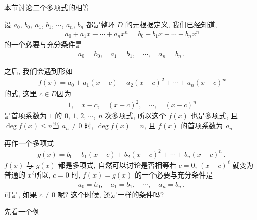 \subsection*{\PolynomialEquality}
\markright{\PolynomialEquality}

本节讨论二个多项式的相等\period

设 $a_0$, $b_0$, $a_1$, $b_1$, $\cdots$, $a_n$, $b_n$ 都是整环 $D$ 的元\period 根据定义, 我们已经知道,
\begin{align*}
    a_0 + a_1 x + \cdots + a_n x^n = b_0 + b_1 x + \cdots + b_n x^n
\end{align*}
的一个必要与充分条件是
\begin{align*}
    a_0 = b_0, \quad a_1 = b_1, \quad \cdots, \quad a_n = b_n \period
\end{align*}

之后, 我们会遇到形如
\begin{align*}
    f(x) = a_0 + a_1 (x - c) + a_2 (x - c)^2 + \cdots + a_n (x - c)^n
\end{align*}
的式, 这里 $c \in D$\period 因为
\begin{align*}
    1, \quad x-c, \quad (x-c)^2, \quad \cdots, \quad (x-c)^n
\end{align*}
是首项系数为 $1$ 的 $0$, $1$, $2$, $\cdots$, $n$ 次多项式, 所以这个 $f(x)$ 也是多项式, 且 $\deg f(x) \leq n$\period 当 $a_n \neq 0$ 时, $\deg f(x) = n$, 且 $f(x)$ 的首项系数为 $a_n$\period

再作一个多项式
\begin{align*}
    g(x) = b_0 + b_1 (x - c) + b_2 (x - c)^2 + \cdots + b_n (x - c)^n \period
\end{align*}
$f(x)$ 与 $g(x)$ 都是多项式, 自然可以讨论是否相等\period 若 $c=0$, $(x-c)^\ell$ 就变为普通的 $x^\ell$\period 所以, $c=0$ 时, $f(x)=g(x)$ 的一个必要与充分条件是
\begin{align*}
    a_0 = b_0, \quad a_1 = b_1, \quad \cdots, \quad a_n = b_n \period
\end{align*}
可是, 如果 $c \neq 0$ 呢? 这个时候, 还是一样的条件吗?

先看一个例\period

